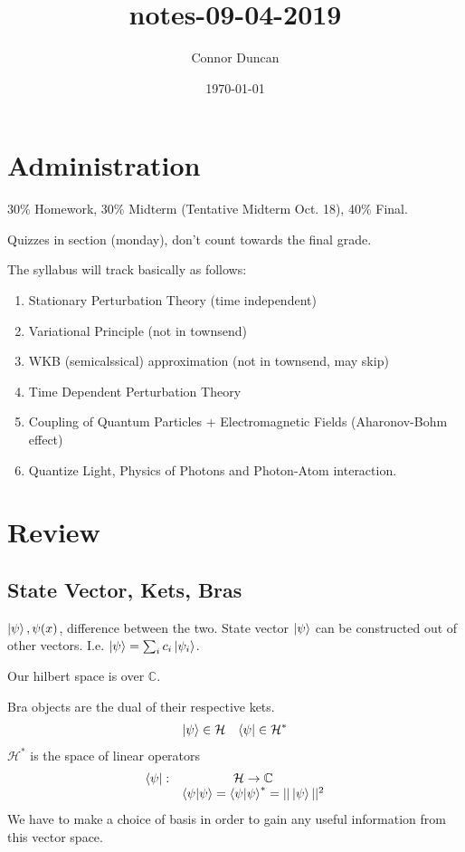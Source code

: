 \documentclass{article}
\author{Connor Duncan}
\date{\today}
\title{notes-09-04-2019}
\theoremstyle{definition}
\begin{document}
\section*{Administration}
30\% Homework, 30\% Midterm (Tentative Midterm Oct. 18), 40\% Final. 

Quizzes in section (monday), don't count towards the final grade.

The syllabus will track basically as follows:
\begin{enumerate}
	\item Stationary Perturbation Theory (time independent)
	\item Variational Principle (not in townsend)
	\item WKB (semicalssical) approximation (not in townsend, may skip)
	\item Time Dependent Perturbation Theory
	\item Coupling of Quantum Particles + Electromagnetic Fields (Aharonov-Bohm effect)
	\item Quantize Light, Physics of Photons and Photon-Atom interaction.
\end{enumerate}

\section{Review}

\subsection{State Vector, Kets, Bras}
$\ket{\psi}, \psi(x)$, difference between the two. 
State vector $\ket{\psi}$ can be constructed out of other vectors. I.e. $\ket{\psi}=\sum_{i}c_i\ket{\psi_i}$.

Our hilbert space is over $\mathbb{C}$.

Bra objects are the dual of their respective kets.
\begin{align}
	\ket{\psi}\in\mathcal{H}	&&	\bra{\psi}\in\mathcal{H}^*
\end{align}
$\mathcal{H}^*$ is the space of linear operators
\begin{equation}
		\begin{matrix}
			\bra{\psi}:	&	\mathcal{H}\rightarrow\mathbb{C}\\
					&	\bra{\psi}\ket{\psi}=\bra{\psi}\ket{\psi}^*=||\ket{\psi}||^2
		\end{matrix}
\end{equation}
We have to make a choice of basis in order to gain any useful information from this vector space.
\end{document}
